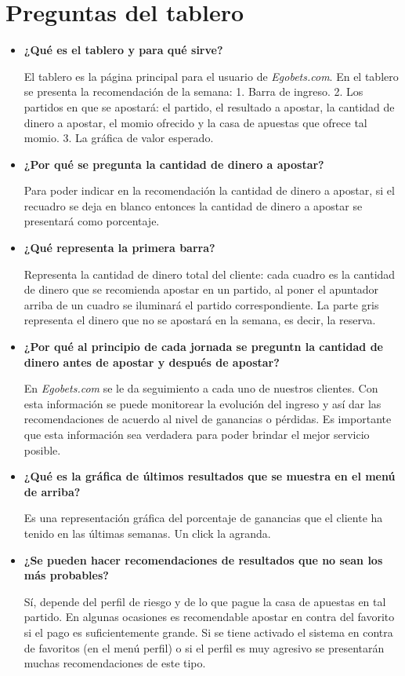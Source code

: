 \section{Preguntas del tablero}
\begin{itemize}

\item \textbf{¿Qué es el tablero y para qué sirve?}


El tablero es la página principal para el usuario de \emph{Egobets.com}. En el tablero se presenta la recomendación de la semana:
1.	Barra de ingreso.
2.	Los partidos en que se apostará: el partido, el resultado a apostar, la cantidad de dinero a apostar, el momio ofrecido y la casa de apuestas que ofrece tal momio.
3.	La gráfica de valor esperado.
\item \textbf{¿Por qué se pregunta la cantidad de dinero a apostar?}


Para poder indicar en la recomendación la cantidad de dinero a apostar, si el recuadro se deja en blanco entonces la cantidad de dinero a apostar se presentará como porcentaje.

\item \textbf{¿Qué representa la primera barra?}


Representa la cantidad de dinero total del cliente: cada cuadro es la cantidad de dinero que se recomienda apostar en un partido, al poner el apuntador arriba de un cuadro se iluminará el partido correspondiente. La parte gris representa el dinero que no se apostará en la semana, es decir, la reserva.

\item \textbf{¿Por qué al principio de cada jornada se preguntn la cantidad de dinero antes de apostar y después de apostar?}


En \emph{Egobets.com} se le da seguimiento a cada uno de nuestros clientes. Con esta información se puede monitorear la evolución del ingreso y así dar las recomendaciones de acuerdo al nivel de ganancias o pérdidas. Es importante que esta información sea verdadera para poder brindar el mejor servicio posible.

\item \textbf{¿Qué es la gráfica de últimos resultados que se muestra en el menú de arriba?}


Es una representación gráfica del porcentaje de ganancias que el cliente ha tenido en las últimas semanas. Un click la agranda.

\item \textbf{¿Se pueden hacer recomendaciones de resultados que no sean los más probables?}


Sí, depende del perfil de riesgo y de lo que pague la casa de apuestas en tal partido. En algunas ocasiones es recomendable apostar en contra del favorito si el pago es suficientemente grande. Si se tiene activado el sistema en contra de favoritos (en el menú perfil) o si el perfil es muy agresivo se presentarán muchas recomendaciones de este tipo. 
\end{itemize}


